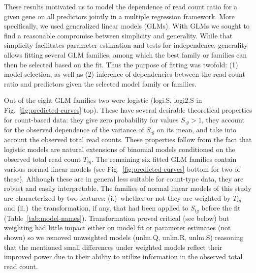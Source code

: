 \documentclass[12pt,letterpaper]{article}
\begin{document}
These results motivated us to model the dependence of read count ratio for a
given gene on all predictors jointly in a multiple regression framework.  More
specifically, we used generalized linear models (GLMs).  With GLMs we sought
to find a reasonable compromise between simplicity and generality.  While that
simplicity facilitates parameter estimation and tests for independence,
generality allows fitting several GLM families, among which the best family or
families can then be selected based on the fit.  Thus the purpose of fitting
was twofold: (1) model selection, as well as (2) inference of dependencies
between the read count ratio and predictors given the selected model family or
families.

Out of the eight GLM families two were logistic (logi.S, logi2.S in
Fig.~\ref{fig:predicted-curves} top).  These have several desirable
theoretical properties for count-based data: they give zero probability for
values \(S_{\cdot g}>1\), they account for the observed dependence of the
variance of \(S_{\cdot g}\) on its mean, and take into account the observed
total read counts.  These properties follow from the fact that logistic models
are natural extensions of binomial models conditioned on the observed total
read count \(T_{ig}\).  The remaining six fitted GLM families contain various
normal linear models (see Fig.~\ref{fig:predicted-curves} bottom for two of
these).  Although these are in general less suitable for count-type data, they
are robust and easily interpretable. The families of normal linear models of
this study are characterized by two features: (i.)~whether or not they are
weighted by \(T_{ig}\) and (ii.)~the transformation, if any, that had been
applied to \(S_{ig}\) before the fit (Table~\ref{tab:model-names}).
Transformation proved critical (see below) but weighting had little impact
either on model fit or parameter estimates (not shown) so we removed
unweighted models (unlm.Q, unlm.R, unlm.S) reasoning that the mentioned small
differences under weighted models reflect their improved power due to their
ability to utilize information in the observed total read count.
\end{document}
